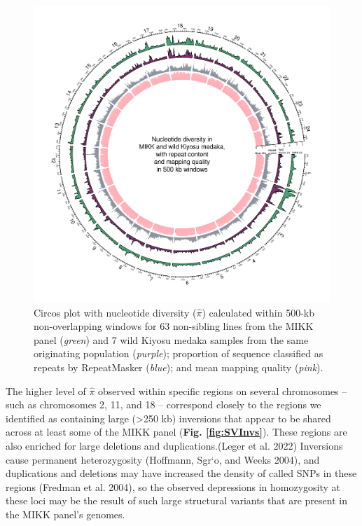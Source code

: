 \documentclass[
]{book}
\begin{document}
\begin{figure}
\includegraphics[width=1\linewidth]{figs/mikk_genome/supp_01_pi_circos} \caption{Circos plot with nucleotide diversity (\(\hat{\pi}\)) calculated within 500-kb non-overlapping windows for 63 non-sibling lines from the MIKK panel (\emph{green}) and 7 wild Kiyosu medaka samples from the same originating population (\emph{purple}); proportion of sequence classified as repeats by RepeatMasker (\emph{blue}); and mean mapping quality (\emph{pink}).}\label{fig:NucleotideDiversity}
\end{figure}

The higher level of \(\hat{\pi}\) observed within specific regions on several chromosomes -- such as chromosomes 2, 11, and 18 -- correspond closely to the regions we identified as containing large (\textgreater250 kb) inversions that appear to be shared across at least some of the MIKK panel (\textbf{Fig. \ref{fig:SVInvs}}). These regions are also enriched for large deletions and duplications.(Leger et al. 2022) Inversions cause permanent heterozygosity (Hoffmann, Sgr`o, and Weeks 2004), and duplications and deletions may have increased the density of called SNPs in these regions (Fredman et al. 2004), so the observed depressions in homozygosity at these loci may be the result of such large structural variants that are present in the MIKK panel's genomes.
\end{document}
